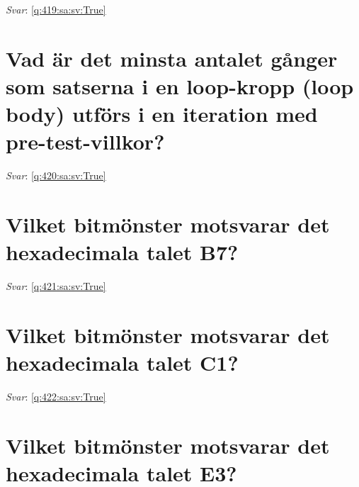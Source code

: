 \documentclass[a4paper,11pt,oneside]{book}
\begin{document}
\begin{sloppypar}
\textit{Svar}: \autoref{q:419:sa:sv:True}



\section{Vad \"ar det minsta antalet g\r{a}nger som satserna i en loop-kropp (loop body) utf\"ors i en iteration med pre-test-villkor?}

\label{q:420:sa:sv:False}

\vspace{2cm}

\noindent\makebox[\textwidth]{\hrulefill}

\vspace{1cm}

\textit{Svar}: \autoref{q:420:sa:sv:True}



\section{Vilket bitm\"onster motsvarar det hexadecimala talet B7?}

\label{q:421:sa:sv:False}

\vspace{2cm}

\noindent\makebox[\textwidth]{\hrulefill}

\vspace{1cm}

\textit{Svar}: \autoref{q:421:sa:sv:True}



\section{Vilket bitm\"onster motsvarar det hexadecimala talet C1?}

\label{q:422:sa:sv:False}

\vspace{2cm}

\noindent\makebox[\textwidth]{\hrulefill}

\vspace{1cm}

\textit{Svar}: \autoref{q:422:sa:sv:True}



\section{Vilket bitm\"onster motsvarar det hexadecimala talet E3?}


\end{sloppypar}
\end{document}

